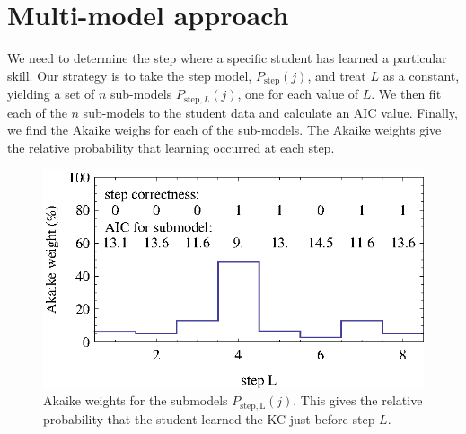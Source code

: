 \documentclass{edm_template}
\begin{document}
\section{Multi-model approach}
\label{multi-model}

We need to determine the step where a specific student has learned a
particular skill.  Our strategy is to take the step model, 
$P_\mathrm{step}(j)$, and treat $L$ as a constant, yielding a set of $n$ 
sub-models $P_{\mathrm{step},L}(j)$, one for each value of $L$.
We then fit each of the $n$ sub-models to the student data and
calculate an AIC value.  Finally, we find the Akaike weighs for each of the
sub-models.  The Akaike weights give the relative probability that learning
occurred at each step.

\begin{figure}
  \centering \includegraphics{step-weights.eps}
   \caption{Akaike weights for the submodels $P_\mathrm{step,L}(j)$.  
     This gives the relative probability that
      the student learned the KC just before step $L$.}
    \label{step-weights}
\end{figure}
\end{document}
